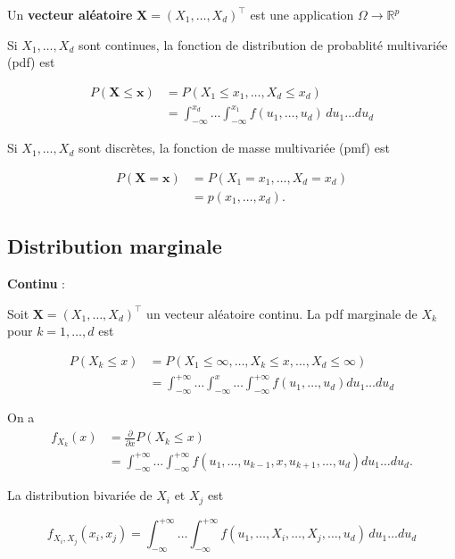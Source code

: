 \documentclass[12pt,a4paper]{article}
\begin{document}
Un \textbf{vecteur aléatoire} $\mathbf{X} = (X_1, \dots, X_d)^\top$ est une application $\Omega \rightarrow \mathbb{R}^p$

\medskip

Si $X_1, \dots, X_d$ sont continues, la fonction de distribution de probablité multivariée (pdf) est

\begin{align*}
P(\mathbf{X} \leq \mathbf{x}) &= P(X_1 \leq x_1, \dots, X_d \leq x_d) \\
&= \int_{-\infty}^{x_d} \dots \int_{-\infty}^{x_1} f(u_1, \dots, u_d) \,du_1 \dots du_d
\end{align*}

\medskip

Si $X_1, \dots, X_d$ sont discrètes, la fonction de masse multivariée (pmf) est

\begin{align*}
P(\mathbf{X} = \mathbf{x}) &= P(X_1 = x_1, \dots, X_d = x_d) \\
&= p(x_1, \dots, x_d).
\end{align*}


\subsection{Distribution marginale}

\textbf{Continu} :

Soit $\mathbf{X} = (X_1, \dots, X_d)^\top$ un vecteur aléatoire continu. La pdf marginale de $X_k$ pour $k=1,\dots,d$ est

\begin{align*}
P(X_k \le x) &= P(X_1 \le \infty, \dots, X_k \le x, \dots, X_d \le \infty) \\
&= \int_{-\infty}^{+\infty} \dots \int_{-\infty}^{x} \dots \int_{-\infty}^{+\infty} f(u_1, \dots, u_d) du_1 \dots du_d
\end{align*}

On a
\begin{align*}
f_{X_k}(x) &= \frac{\partial}{\partial x} P(X_k \leq x) \\
&= \int_{-\infty}^{+\infty} \dots \int_{-\infty}^{+\infty} f(u_1, \dots, u_{k-1}, x, u_{k+1}, \dots, u_d) du_1 \dots du_d .
\end{align*}

La distribution bivariée de $X_i$ et $X_j$ est

$$ f_{X_i, X_j}(x_i, x_j) = \int_{-\infty}^{+\infty} \dots \int_{-\infty}^{+\infty} f(u_1, \dots, X_i, \dots, X_j, \dots, u_d) \, du_1 \dots du_d $$
\end{document}
